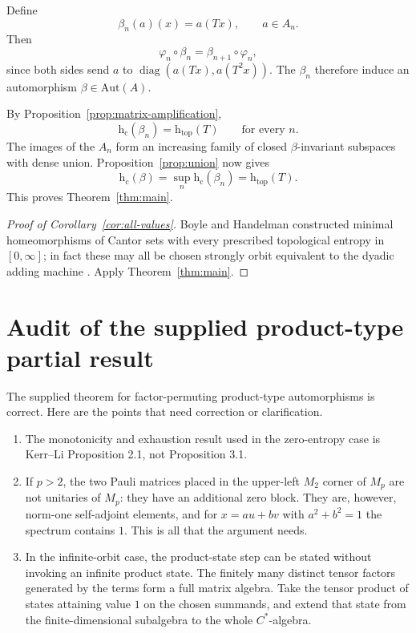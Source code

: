 \documentclass[11pt]{article}
\theoremstyle{remark}
\newcommand{\hc}{\mathrm{h}_{\mathrm c}}
\newcommand{\htop}{\mathrm{h}_{\mathrm{top}}}
\newcommand{\Aut}{\mathrm{Aut}}
\begin{document}
Define
\[
  \beta_n(a)(x)=a(Tx),\qquad a\in A_n.
\]
Then
\[
 \varphi_n\circ\beta_n=\beta_{n+1}\circ\varphi_n,
\]
since both sides send $a$ to
$\operatorname{diag}(a(Tx),a(T^2x))$.  The $\beta_n$ therefore induce an
automorphism $\beta\in\Aut(A)$.

By Proposition~\ref{prop:matrix-amplification},
\[
  \hc(\beta_n)=\htop(T)
  \qquad\text{for every }n.
\]
The images of the $A_n$ form an increasing family of closed
$\beta$-invariant subspaces with dense union.  Proposition~\ref{prop:union}
now gives
\[
  \hc(\beta)
  =\sup_n\hc(\beta_n)
  =\htop(T).
\]
This proves Theorem~\ref{thm:main}.

\begin{proof}[Proof of Corollary~\ref{cor:all-values}]
Boyle and Handelman constructed minimal homeomorphisms of Cantor sets with
every prescribed topological entropy in $[0,\infty]$; in fact these may all
be chosen strongly orbit equivalent to the dyadic adding machine
\cite{BoyleHandelman}.  Apply Theorem~\ref{thm:main}.
\end{proof}

\section{Audit of the supplied product-type partial result}

The supplied theorem for factor-permuting product-type automorphisms is
correct.  Here are the points that need correction or clarification.

\begin{enumerate}[label=(\arabic*)]
\item The monotonicity and exhaustion result used in the zero-entropy case is
Kerr--Li Proposition 2.1, not Proposition 3.1.

\item If $p>2$, the two Pauli matrices placed in the upper-left $M_2$ corner
of $M_p$ are not unitaries of $M_p$: they have an additional zero block.
They are, however, norm-one self-adjoint elements, and for
$x=au+bv$ with $a^2+b^2=1$ the spectrum contains $1$.  This is all that the
argument needs.

\item In the infinite-orbit case, the product-state step can be stated
without invoking an infinite product state.  The finitely many distinct
tensor factors generated by the terms form a full matrix algebra.  Take the
tensor product of states attaining value $1$ on the chosen summands, and
extend that state from the finite-dimensional subalgebra to the whole
$C^*$-algebra.
\end{enumerate}
\end{document}

